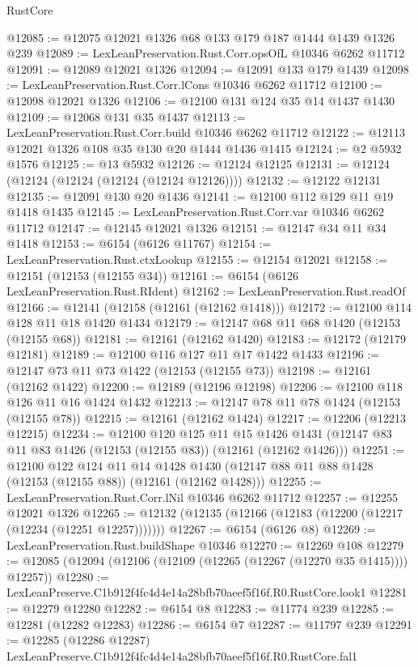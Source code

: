\begin{lexlean}{RustCore}
\begin{coremodule}
@12085 := @12075 @12021 @1326 @68 @133 @179 @187 @1444 @1439 @1326 @239
@12089 := LexLeanPreservation.Rust.Corr.opsOfL @10346 @6262 @11712
@12091 := @12089 @12021 @1326
@12094 := @12091 @133 @179 @1439
@12098 := LexLeanPreservation.Rust.Corr.lCons @10346 @6262 @11712
@12100 := @12098 @12021 @1326
@12106 := @12100 @131 @124 @35 @14 @1437 @1430
@12109 := @12068 @131 @35 @1437
@12113 := LexLeanPreservation.Rust.Corr.build @10346 @6262 @11712
@12122 := @12113 @12021 @1326 @108 @35 @130 @20 @1444 @1436 @1415
@12124 := @2 @5932 @1576
@12125 := @13 @5932
@12126 := @12124 @12125
@12131 := @12124 (@12124 (@12124 (@12124 (@12124 @12126))))
@12132 := @12122 @12131
@12135 := @12091 @130 @20 @1436
@12141 := @12100 @112 @129 @11 @19 @1418 @1435
@12145 := LexLeanPreservation.Rust.Corr.var @10346 @6262 @11712
@12147 := @12145 @12021 @1326
@12151 := @12147 @34 @11 @34 @1418
@12153 := @6154 (@6126 @11767)
@12154 := LexLeanPreservation.Rust.ctxLookup
@12155 := @12154 @12021
@12158 := @12151 (@12153 (@12155 @34))
@12161 := @6154 (@6126 LexLeanPreservation.Rust.RIdent)
@12162 := LexLeanPreservation.Rust.readOf
@12166 := @12141 (@12158 (@12161 (@12162 @1418)))
@12172 := @12100 @114 @128 @11 @18 @1420 @1434
@12179 := @12147 @68 @11 @68 @1420 (@12153 (@12155 @68))
@12181 := @12161 (@12162 @1420)
@12183 := @12172 (@12179 @12181)
@12189 := @12100 @116 @127 @11 @17 @1422 @1433
@12196 := @12147 @73 @11 @73 @1422 (@12153 (@12155 @73))
@12198 := @12161 (@12162 @1422)
@12200 := @12189 (@12196 @12198)
@12206 := @12100 @118 @126 @11 @16 @1424 @1432
@12213 := @12147 @78 @11 @78 @1424 (@12153 (@12155 @78))
@12215 := @12161 (@12162 @1424)
@12217 := @12206 (@12213 @12215)
@12234 := @12100
    @120
    @125
    @11
    @15
    @1426
    @1431
    (@12147 @83 @11 @83 @1426 (@12153 (@12155 @83)) (@12161 (@12162 @1426)))
@12251 := @12100
    @122
    @124
    @11
    @14
    @1428
    @1430
    (@12147 @88 @11 @88 @1428 (@12153 (@12155 @88)) (@12161 (@12162 @1428)))
@12255 := LexLeanPreservation.Rust.Corr.lNil @10346 @6262 @11712
@12257 := @12255 @12021 @1326
@12265 := @12132 (@12135 (@12166 (@12183 (@12200 (@12217 (@12234 (@12251 @12257)))))))
@12267 := @6154 (@6126 @8)
@12269 := LexLeanPreservation.Rust.buildShape @10346
@12270 := @12269 @108
@12279 := @12085 (@12094 (@12106 (@12109 (@12265 (@12267 (@12270 @35 @1415)))) @12257))
@12280 := LexLeanPreserve.C1b912f4fc4d4e14a28bfb70aeef5f16f.R0.RustCore.look1
@12281 := @12279 @12280
@12282 := @6154 @8
@12283 := @11774 @239
@12285 := @12281 (@12282 @12283)
@12286 := @6154 @7
@12287 := @11797 @239
@12291 := @12285 (@12286 @12287) LexLeanPreserve.C1b912f4fc4d4e14a28bfb70aeef5f16f.R0.RustCore.fal1

\end{coremodule}
\end{lexlean}
